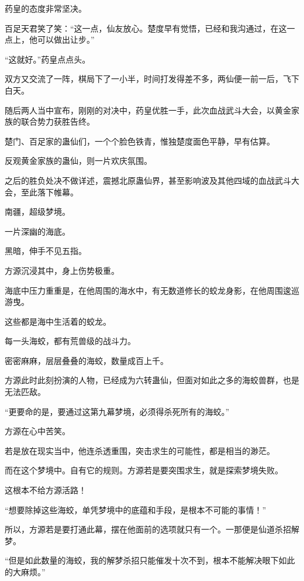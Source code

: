 
\begin{this_body}



药皇的态度非常坚决。

百足天君笑了笑：“这一点，仙友放心。楚度早有觉悟，已经和我沟通过，在这一点上，他可以做出让步。”

“这就好。”药皇点点头。

双方又交流了一阵，棋局下了一小半，时间打发得差不多，两仙便一前一后，飞下白天。

随后两人当中宣布，刚刚的对决中，药皇优胜一手，此次血战武斗大会，以黄金家族的联合势力获胜告终。

楚门、百足家的蛊仙们，一个个脸色铁青，惟独楚度面色平静，早有估算。

反观黄金家族的蛊仙，则一片欢庆氛围。

之后的胜负处决不做详述，震撼北原蛊仙界，甚至影响波及其他四域的血战武斗大会，至此落下帷幕。

南疆，超级梦境。

一片深幽的海底。

黑暗，伸手不见五指。

方源沉浸其中，身上伤势极重。

海底中压力重重是，在他周围的海水中，有无数道修长的蛟龙身影，在他周围逡巡游曳。

这些都是海中生活着的蛟龙。

每一头海蛟，都有荒兽级的战斗力。

密密麻麻，层层叠叠的海蛟，数量成百上千。

方源此时此刻扮演的人物，已经成为六转蛊仙，但面对如此之多的海蛟兽群，也是无法匹敌。

“更要命的是，要通过这第九幕梦境，必须得杀死所有的海蛟。”

方源在心中苦笑。

若是放在现实当中，他连杀透重围，突击求生的可能性，都是相当的渺茫。

而在这个梦境中。自有它的规则。方源若是要突围求生，就是探索梦境失败。

这根本不给方源活路！

“想要除掉这些海蛟，单凭梦境中的底蕴和手段，是根本不可能的事情！”

所以，方源若是要打通此幕，摆在他面前的选项就只有一个。一那便是仙道杀招解梦。

“但是如此数量的海蛟，我的解梦杀招只能催发十次不到，根本不能解决眼下如此的大麻烦。”


\end{this_body}
